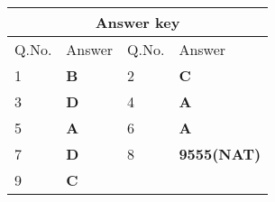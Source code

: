 \setlength\arrayrulewidth{1pt}
\begin{table}[H]
	\centering
	\begin{tabular}{|p{1.5cm}|p{1.5cm}||p{1.5cm}|p{1.5cm}|}
		\hline
		\multicolumn{4}{|c|}{\textbf{Answer key}}\\\hline\hline
		\rowcolor{ocrel}Q.No.&Answer&Q.No.&Answer\\\hline
		1&\textbf{B} &2&\textbf{C}\\\hline 
		3&\textbf{D} &4&\textbf{A} \\\hline
		5&\textbf{A} &6&\textbf{A} \\\hline
		7&\textbf{D}&8&\textbf{9555(NAT)}\\\hline
		9&\textbf{C}&&\textbf{}\\\hline
		
	\end{tabular}
\end{table}

